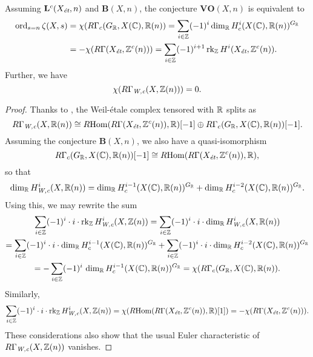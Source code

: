\documentclass{article}
\numberwithin{equation}{section}
\begin{document}
\begin{proposition}
  \label{prop:VO(X,n)-assuming-B(X,n)}
  Assuming $\mathbf{L}^c (X_\et, n)$ and $\mathbf{B} (X,n)$, the conjecture
  $\mathbf{VO} (X,n)$ is equivalent to
  \begin{align*}
    \ord_{s=n} \zeta (X,s) & = \chi (R\Gamma_c (G_\RR, X(\CC), \RR (n))
    = \sum_{i \in \ZZ} (-1)^i \dim_\RR H^i_c (X(\CC), \RR (n))^{G_\RR} \\
                           & = -\chi (R\Gamma (X_\et, \ZZ^c (n)))
    = \sum_{i \in \ZZ} (-1)^{i+1} \rk_\ZZ H^i (X_\et, \ZZ^c (n)).
  \end{align*}
  Further, we have
  $$\chi (R\Gamma_\Wc (X, \ZZ(n))) = 0.$$

  \begin{proof}
    Thanks to \cite[Proposition~7.8]{Beshenov-Weil-etale-1}, the Weil-étale
    complex tensored with $\RR$ splits as
    \[ R\Gamma_\Wc (X,\RR (n)) \cong
      \RHom (R\Gamma (X_\et, \ZZ^c (n)), \RR) [-1] \oplus
      R\Gamma_c (G_\RR, X (\CC), \RR (n)) [-1]. \]
    Assuming the conjecture $\mathbf{B} (X,n)$, we also have a quasi-isomorphism
    \[ R\Gamma_c (G_\RR, X (\CC), \RR (n)) [-1] \cong
      \RHom (R\Gamma (X_\et, \ZZ^c (n)), \RR), \]
    so that
    \[ \dim_\RR H^i_\Wc (X,\RR(n)) =
      \dim_\RR H^{i-1}_c (X (\CC), \RR (n))^{G_\RR} +
      \dim_\RR H^{i-2}_c (X (\CC), \RR (n))^{G_\RR}. \]
    Using this, we may rewrite the sum
    \begin{multline*}
      \sum_{i \in \ZZ} (-1)^i \cdot i \cdot \rk_\ZZ H^i_\Wc (X, \ZZ (n)) =
      \sum_{i \in \ZZ} (-1)^i \cdot i \cdot \dim_\RR H^i_\Wc (X, \RR (n)) \\
      = \sum_{i \in \ZZ} (-1)^i \cdot i \cdot
      \dim_\RR H^{i-1}_c (X (\CC), \RR (n))^{G_\RR} +
      \sum_{i \in \ZZ} (-1)^i \cdot i \cdot
      \dim_\RR H^{i-2}_c (X (\CC), \RR (n))^{G_\RR} \\
      = -\sum_{i \in \ZZ} (-1)^i \, \dim_\RR H^{i-1}_c (X (\CC), \RR (n))^{G_\RR}
      = \chi (R\Gamma_c (G_\RR, X (\CC), \RR (n)).
    \end{multline*}
    Similarly,
    \[ \sum_{i \in \ZZ} (-1)^i \cdot i \cdot \rk_\ZZ H^i_\Wc (X, \ZZ (n)) =
      \chi (\RHom (R\Gamma (X_\et, \ZZ^c (n)), \RR) [1]) =
      -\chi (R\Gamma (X_\et, \ZZ^c (n))). \]
    These considerations also show that the usual Euler characteristic of
    $R\Gamma_\Wc (X, \ZZ(n))$ vanishes.
  \end{proof}
\end{proposition}
\end{document}
